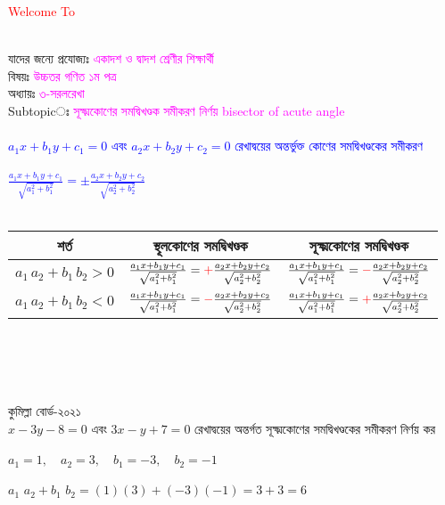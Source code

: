 \documentclass{article}
\begin{document}
 
	\Large
	\textcolor{red}{Welcome To} 
	\\
	\\
	যাদের জন্যে প্রযোজ্যঃ  	\textcolor{magenta}{একাদশ ও দ্বাদশ শ্রেণীর শিক্ষার্থী} \\
	বিষয়ঃ \textcolor{magenta}{উচ্চতর গণিত ১ম পত্র} \\
	অধ্যায়ঃ \textcolor{magenta}{৩-সরলরেখা}\\ 
	Subtopicঃ  \textcolor{magenta}{ সূক্ষ্মকোণের সমদ্বিখণ্ডক সমীকরণ নির্ণয় bisector of acute angle }\\
	\\
	\textcolor{blue}{$a_1x+b_1y+c_1=0$ এবং $a_2x+b_2y+c_2=0$ রেখাদ্বয়ের অন্তর্ভুক্ত  কোণের সমদ্বিখণ্ডকের সমীকরণ \\
		\\
		$\frac{a_1x+b_1y+c_1}{\sqrt{a_1^2+b_1^2}}=\pm \frac{a_2x+b_2y+c_2}{\sqrt{a_2^2+b_2^2}}$}\\
	\\
	\begin{tabular}{|c|c|c|}
		\hline 
		শর্ত	& স্থূলকোণের সমদ্বিখণ্ডক  & সূক্ষ্মকোণের সমদ্বিখণ্ডক \\ 
		\hline  
		$a_1\,a_2+b_1\,b_2>0$	& $\frac{a_1x+b_1y+c_1}{\sqrt{a_1^2+b_1^2}}=\textcolor{red}{+} \frac{a_2x+b_2y+c_2}{\sqrt{a_2^2+b_2^2}}$& $\frac{a_1x+b_1y+c_1}{\sqrt{a_1^2+b_1^2}}= \textcolor{red}{-} \frac{a_2x+b_2y+c_2}{\sqrt{a_2^2+b_2^2}}$\\
		\hline 
		$a_1\,a_2+b_1\,b_2<0$	& $\frac{a_1x+b_1y+c_1}{\sqrt{a_1^2+b_1^2}}=\textcolor{red}{-} \frac{a_2x+b_2y+c_2}{\sqrt{a_2^2+b_2^2}}$& $\frac{a_1x+b_1y+c_1}{\sqrt{a_1^2+b_1^2}}= \textcolor{red}{+} \frac{a_2x+b_2y+c_2}{\sqrt{a_2^2+b_2^2}}$\\
		\hline 
	\end{tabular}\\
	\\ 
	\\
	\\
	কুমিল্লা  বোর্ড-২০২১\\ 
	$x-3y-8=0$ এবং $3x-y+7=0$ রেখাদ্বয়ের অন্তর্গত সূক্ষ্মকোণের সমদ্বিখণ্ডকের সমীকরণ নির্ণয় কর  \\
	\\
	$a_1=1,\quad a_2=3,\quad b_1=-3,\quad b_2=-1$\\
	\\
	$a_1\,\,a_2+b_1\,\,b_2=(1)(3)+(-3)(-1)=3+3=6$\\
\end{document}
